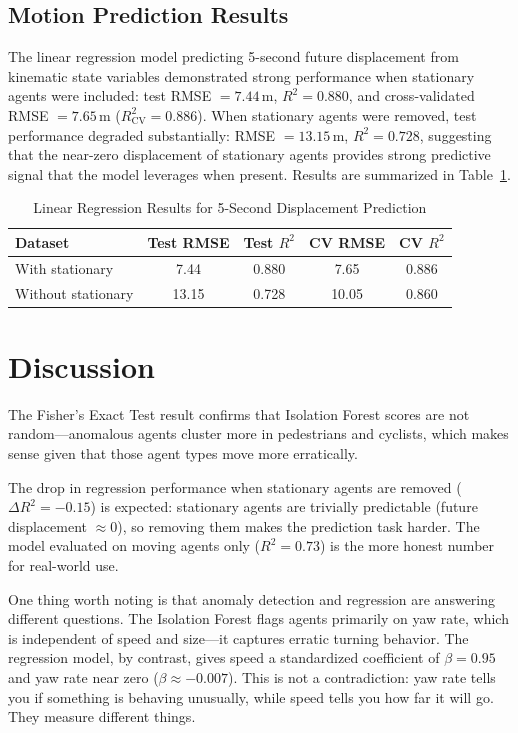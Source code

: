 \documentclass[conference]{IEEEtran}
\begin{document}
\subsection{Motion Prediction Results}

The linear regression model predicting 5-second future displacement from kinematic state variables demonstrated strong performance when stationary agents were included: test RMSE $= 7.44$\,m, $R^2 = 0.880$, and cross-validated RMSE $= 7.65$\,m ($R^2_\text{CV} = 0.886$). When stationary agents were removed, test performance degraded substantially: RMSE $= 13.15$\,m, $R^2 = 0.728$, suggesting that the near-zero displacement of stationary agents provides strong predictive signal that the model leverages when present. Results are summarized in Table~\ref{tab:regression}.

\begin{table}[h]
\centering
\caption{Linear Regression Results for 5-Second Displacement Prediction}
\label{tab:regression}
\begin{tabular}{lcccc}
\toprule
Dataset & Test RMSE & Test $R^2$ & CV RMSE & CV $R^2$ \\
\midrule
With stationary    & 7.44  & 0.880 & 7.65  & 0.886 \\
Without stationary & 13.15 & 0.728 & 10.05 & 0.860 \\
\bottomrule
\end{tabular}
\end{table}

\section{Discussion}

The Fisher's Exact Test result confirms that Isolation Forest scores are not random---anomalous agents cluster more in pedestrians and cyclists, which makes sense given that those agent types move more erratically.

The drop in regression performance when stationary agents are removed ($\Delta R^2 = -0.15$) is expected: stationary agents are trivially predictable (future displacement $\approx 0$), so removing them makes the prediction task harder. The model evaluated on moving agents only ($R^2 = 0.73$) is the more honest number for real-world use.

One thing worth noting is that anomaly detection and regression are answering different questions. The Isolation Forest flags agents primarily on yaw rate, which is independent of speed and size---it captures erratic turning behavior. The regression model, by contrast, gives speed a standardized coefficient of $\beta = 0.95$ and yaw rate near zero ($\beta \approx -0.007$). This is not a contradiction: yaw rate tells you if something is behaving unusually, while speed tells you how far it will go. They measure different things.
\end{document}

